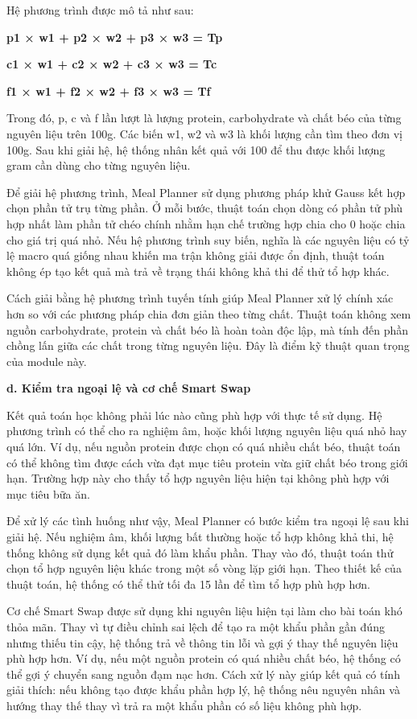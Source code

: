 Hệ phương trình được mô tả như sau:

\textbf{p1 × w1 + p2 × w2 + p3 × w3 = Tp}

\textbf{c1 × w1 + c2 × w2 + c3 × w3 = Tc}

\textbf{f1 × w1 + f2 × w2 + f3 × w3 = Tf}

Trong đó, p, c và f lần lượt là lượng protein, carbohydrate và chất béo của từng nguyên liệu trên 100g. Các biến w1, w2 và w3 là khối lượng cần tìm theo đơn vị 100g. Sau khi giải hệ, hệ thống nhân kết quả với 100 để thu được khối lượng gram cần dùng cho từng nguyên liệu.

Để giải hệ phương trình, Meal Planner sử dụng phương pháp khử Gauss kết hợp chọn phần tử trụ từng phần. Ở mỗi bước, thuật toán chọn dòng có phần tử phù hợp nhất làm phần tử chéo chính nhằm hạn chế trường hợp chia cho 0 hoặc chia cho giá trị quá nhỏ. Nếu hệ phương trình suy biến, nghĩa là các nguyên liệu có tỷ lệ macro quá giống nhau khiến ma trận không giải được ổn định, thuật toán không ép tạo kết quả mà trả về trạng thái không khả thi để thử tổ hợp khác.

Cách giải bằng hệ phương trình tuyến tính giúp Meal Planner xử lý chính xác hơn so với các phương pháp chia đơn giản theo từng chất. Thuật toán không xem nguồn carbohydrate, protein và chất béo là hoàn toàn độc lập, mà tính đến phần chồng lấn giữa các chất trong từng nguyên liệu. Đây là điểm kỹ thuật quan trọng của module này.

\textbf{d. Kiểm tra ngoại lệ và cơ chế Smart Swap}

Kết quả toán học không phải lúc nào cũng phù hợp với thực tế sử dụng. Hệ phương trình có thể cho ra nghiệm âm, hoặc khối lượng nguyên liệu quá nhỏ hay quá lớn. Ví dụ, nếu nguồn protein được chọn có quá nhiều chất béo, thuật toán có thể không tìm được cách vừa đạt mục tiêu protein vừa giữ chất béo trong giới hạn. Trường hợp này cho thấy tổ hợp nguyên liệu hiện tại không phù hợp với mục tiêu bữa ăn.

Để xử lý các tình huống như vậy, Meal Planner có bước kiểm tra ngoại lệ sau khi giải hệ. Nếu nghiệm âm, khối lượng bất thường hoặc tổ hợp không khả thi, hệ thống không sử dụng kết quả đó làm khẩu phần. Thay vào đó, thuật toán thử chọn tổ hợp nguyên liệu khác trong một số vòng lặp giới hạn. Theo thiết kế của thuật toán, hệ thống có thể thử tối đa 15 lần để tìm tổ hợp phù hợp hơn.

Cơ chế Smart Swap được sử dụng khi nguyên liệu hiện tại làm cho bài toán khó thỏa mãn. Thay vì tự điều chỉnh sai lệch để tạo ra một khẩu phần gần đúng nhưng thiếu tin cậy, hệ thống trả về thông tin lỗi và gợi ý thay thế nguyên liệu phù hợp hơn. Ví dụ, nếu một nguồn protein có quá nhiều chất béo, hệ thống có thể gợi ý chuyển sang nguồn đạm nạc hơn. Cách xử lý này giúp kết quả có tính giải thích: nếu không tạo được khẩu phần hợp lý, hệ thống nêu nguyên nhân và hướng thay thế thay vì trả ra một khẩu phần có số liệu không phù hợp.


